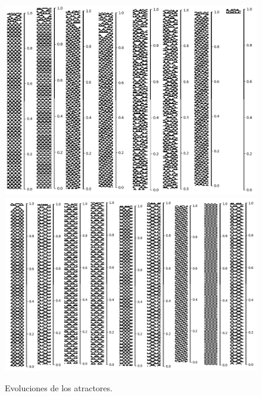 \documentclass[11pt]{article}
\begin{document}
			\begin{figure}[H]
			\centering
			\includegraphics[scale=0.3]{resources/Atractores54/atractor_54_size_16_res.png}
			\includegraphics[scale=0.3]{resources/Atractores54/atractor_54_size_16_res1.png}
			\caption{Evoluciones de los atractores.}\label{fig:picture}
			\end{figure}
\end{document}

